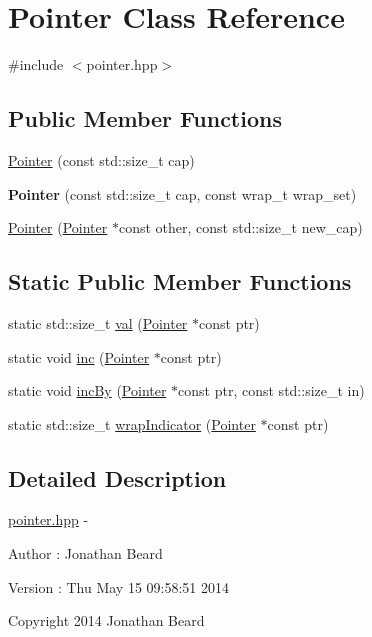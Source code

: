 \hypertarget{class_pointer}{}\section{Pointer Class Reference}
\label{class_pointer}


{\ttfamily \#include $<$pointer.\+hpp$>$}

\subsection*{Public Member Functions}
\begin{DoxyCompactItemize}
\item 
\hyperlink{class_pointer_ae124185327ebd4938437141a6aec7ede}{Pointer} (const std\+::size\+\_\+t cap)
\item 
\hypertarget{class_pointer_a5f7fd9269cec287e5e78e026d20c2fca}{}\label{class_pointer_a5f7fd9269cec287e5e78e026d20c2fca} 
{\bfseries Pointer} (const std\+::size\+\_\+t cap, const wrap\+\_\+t wrap\+\_\+set)
\item 
\hyperlink{class_pointer_a94c66784ca4f1f69be6feac9d8ecc7f2}{Pointer} (\hyperlink{class_pointer}{Pointer} $\ast$const other, const std\+::size\+\_\+t new\+\_\+cap)
\end{DoxyCompactItemize}
\subsection*{Static Public Member Functions}
\begin{DoxyCompactItemize}
\item 
static std\+::size\+\_\+t \hyperlink{class_pointer_a27de62075753297225ad8217ba123307}{val} (\hyperlink{class_pointer}{Pointer} $\ast$const ptr)
\item 
static void \hyperlink{class_pointer_adc3754145e0b7a506ce0ad41732963c5}{inc} (\hyperlink{class_pointer}{Pointer} $\ast$const ptr)
\item 
static void \hyperlink{class_pointer_af2a6fd4fb44c191ae8f76898d8626be0}{inc\+By} (\hyperlink{class_pointer}{Pointer} $\ast$const ptr, const std\+::size\+\_\+t in)
\item 
static std\+::size\+\_\+t \hyperlink{class_pointer_a47f973d7d52da42d4089e576ed8584de}{wrap\+Indicator} (\hyperlink{class_pointer}{Pointer} $\ast$const ptr)
\end{DoxyCompactItemize}


\subsection{Detailed Description}
\hyperlink{pointer_8hpp_source}{pointer.\+hpp} -\/ \begin{DoxyAuthor}{Author}
\+: Jonathan Beard 
\end{DoxyAuthor}
\begin{DoxyVersion}{Version}
\+: Thu May 15 09\+:58\+:51 2014
\end{DoxyVersion}
Copyright 2014 Jonathan Beard

